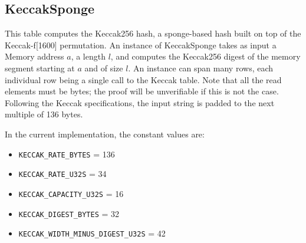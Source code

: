 \subsection{KeccakSponge}
\label{keccak-sponge}

This table computes the Keccak256 hash, a sponge-based hash built on top of the Keccak-f[1600] permutation. An instance of KeccakSponge takes as input a Memory address $a$,
a length $l$, and computes the Keccak256 digest of the memory segment starting at $a$ and of size $l$. An instance can span many rows, each individual row being a single call to
the Keccak table. Note that all the read elements must be bytes; the proof will be unverifiable if this is not the case. Following the Keccak specifications, the input string is padded to the next multiple of 136 bytes. 

In the current implementation, the constant values are:
\begin{itemize}
    \item \texttt{KECCAK\_RATE\_BYTES} = 136
    \item \texttt{KECCAK\_RATE\_U32S} = 34
    \item \texttt{KECCAK\_CAPACITY\_U32S} = 16
    \item \texttt{KECCAK\_DIGEST\_BYTES} = 32
    \item \texttt{KECCAK\_WIDTH\_MINUS\_DIGEST\_U32S} = 42
\end{itemize}

